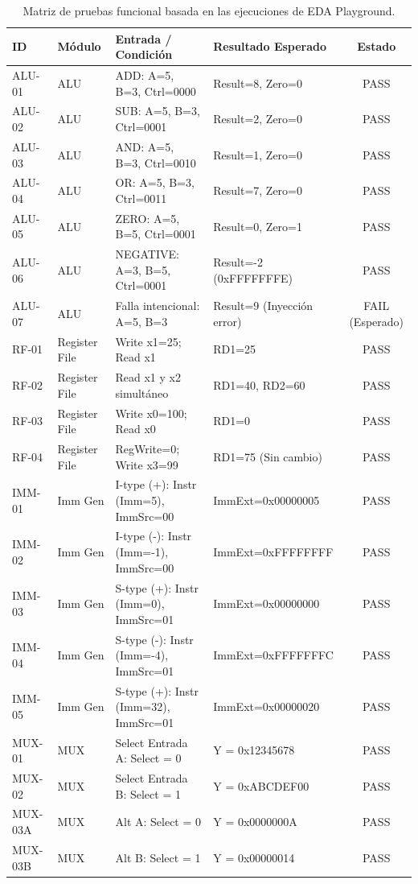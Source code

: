 \documentclass[12pt,a4paper]{article}
\begin{document}
\begin{table}[H]
\centering
\small
\begin{tabular}{l l p{4.2cm} p{3.8cm} c}
\toprule
\textbf{ID} & \textbf{Módulo} & \textbf{Entrada / Condición} & \textbf{Resultado Esperado} & \textbf{Estado} \\
\midrule
ALU-01 & ALU & ADD: A=5, B=3, Ctrl=0000 & Result=8, Zero=0 & PASS \\
ALU-02 & ALU & SUB: A=5, B=3, Ctrl=0001 & Result=2, Zero=0 & PASS \\
ALU-03 & ALU & AND: A=5, B=3, Ctrl=0010 & Result=1, Zero=0 & PASS \\
ALU-04 & ALU & OR: A=5, B=3, Ctrl=0011 & Result=7, Zero=0 & PASS \\
ALU-05 & ALU & ZERO: A=5, B=5, Ctrl=0001 & Result=0, Zero=1 & PASS \\
ALU-06 & ALU & NEGATIVE: A=3, B=5, Ctrl=0001 & Result=-2 (0xFFFFFFFE) & PASS \\
ALU-07 & ALU & Falla intencional: A=5, B=3 & Result=9 (Inyección error) & FAIL (Esperado) \\
\hline
RF-01 & Register File & Write x1=25; Read x1 & RD1=25 & PASS \\
RF-02 & Register File & Read x1 y x2 simultáneo & RD1=40, RD2=60 & PASS \\
RF-03 & Register File & Write x0=100; Read x0 & RD1=0 & PASS \\
RF-04 & Register File & RegWrite=0; Write x3=99 & RD1=75 (Sin cambio) & PASS \\
\hline
IMM-01 & Imm Gen & I-type (+): Instr (Imm=5), ImmSrc=00 & ImmExt=0x00000005 & PASS \\
IMM-02 & Imm Gen & I-type (-): Instr (Imm=-1), ImmSrc=00 & ImmExt=0xFFFFFFFF & PASS \\
IMM-03 & Imm Gen & S-type (+): Instr (Imm=0), ImmSrc=01 & ImmExt=0x00000000 & PASS \\
IMM-04 & Imm Gen & S-type (-): Instr (Imm=-4), ImmSrc=01 & ImmExt=0xFFFFFFFC & PASS \\
IMM-05 & Imm Gen & S-type (+): Instr (Imm=32), ImmSrc=01 & ImmExt=0x00000020 & PASS \\
\hline
MUX-01 & MUX & Select Entrada A: Select = 0 & Y = 0x12345678 & PASS \\
MUX-02 & MUX & Select Entrada B: Select = 1 & Y = 0xABCDEF00 & PASS \\
MUX-03A & MUX & Alt A: Select = 0 & Y = 0x0000000A & PASS \\
MUX-03B & MUX & Alt B: Select = 1 & Y = 0x00000014 & PASS \\
\bottomrule
\end{tabular}
\caption{Matriz de pruebas funcional basada en las ejecuciones de EDA Playground.}
\end{table}
\end{document}
